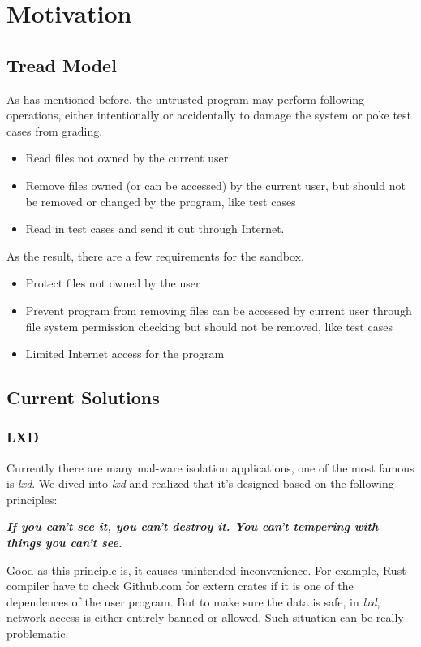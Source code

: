 \documentclass[conference,compsoc]{IEEEtran}
\begin{document}
\section {Motivation}
	\subsection{Tread Model}
		\par
			As has mentioned before, the untrusted program may perform following operations, either intentionally or accidentally to damage the system or poke test cases from grading.
			\begin{itemize}
				\item {Read files not owned by the current user}
				\item {Remove files owned (or can be accessed) by the current user, but should not be removed or changed by the program, like test cases}
				\item {Read in test cases and send it out through Internet.}
			\end{itemize}
		\par
			As the result, there are a few requirements for the sandbox.
			\begin{itemize}
				\item {Protect files not owned by the user}
				\item {Prevent program from removing files can be accessed by current user through file system permission checking but should not be removed, like test cases}
				\item {Limited Internet access for the program}
			\end{itemize}
	\subsection{Current Solutions}
		\subsubsection{LXD}
			\par
				Currently there are many mal-ware isolation applications, one of the most famous is \emph{lxd}. 
				We dived into \emph{lxd} and realized that it's designed based on the following principles:
			\par
				\emph{\textbf{
					If you can't see it, you can't destroy it. 
					You can't tempering with things you can't see.
				}}

			\par
				Good as this principle is, it causes unintended inconvenience. 
				For example, Rust compiler have to check Github.com for extern crates if it is one of the dependences of the user program. 
				But to make sure the data is safe, in \emph{lxd}, network access is either entirely banned or allowed.
				Such situation can be really problematic.
\end{document}
